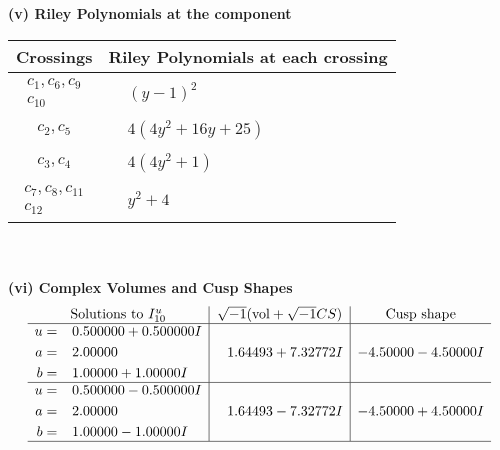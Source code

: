 \documentclass[1p]{elsarticle_modified}
\theoremstyle{definition}
\newcommand{\I}{\sqrt{-1}}
\begin{document}
\newpage\renewcommand{\arraystretch}{1}
\flushleft \textbf{(v) Riley Polynomials at the component}\newline \\
\begin{tabular}{m{50pt}|m{274pt}}
Crossings & \hspace{64pt}Riley Polynomials at each crossing \\
\hline $$\begin{aligned}c_{1},c_{6},c_{9}\\c_{10}\end{aligned}$$&$\begin{aligned}
&(y-1)^2
\end{aligned}$\\
\hline $$\begin{aligned}c_{2},c_{5}\end{aligned}$$&$\begin{aligned}
&4(4 y^2+16 y+25)
\end{aligned}$\\
\hline $$\begin{aligned}c_{3},c_{4}\end{aligned}$$&$\begin{aligned}
&4(4 y^2+1)
\end{aligned}$\\
\hline $$\begin{aligned}c_{7},c_{8},c_{11}\\c_{12}\end{aligned}$$&$\begin{aligned}
&y^2+4
\end{aligned}$\\
\hline
\end{tabular}\\~\\
\newpage\flushleft \textbf{(vi) Complex Volumes and Cusp Shapes}
$$\begin{array}{c|c|c}  
\text{Solutions to }I^u_{10}& \I (\text{vol} + \sqrt{-1}CS) & \text{Cusp shape}\\
 \hline 
\begin{aligned}
u &= \phantom{-}0.500000 + 0.500000 I \\
a &= \phantom{-}2.00000\phantom{ +0.000000I} \\
b &= \phantom{-}1.00000 + 1.00000 I\end{aligned}
 & \phantom{-}1.64493 + 7.32772 I & -4.50000 - 4.50000 I \\ \hline\begin{aligned}
u &= \phantom{-}0.500000 - 0.500000 I \\
a &= \phantom{-}2.00000\phantom{ +0.000000I} \\
b &= \phantom{-}1.00000 - 1.00000 I\end{aligned}
 & \phantom{-}1.64493 - 7.32772 I & -4.50000 + 4.50000 I\\
 \hline 
 \end{array}$$\newpage\newpage\renewcommand{\arraystretch}{1}
\end{document}
